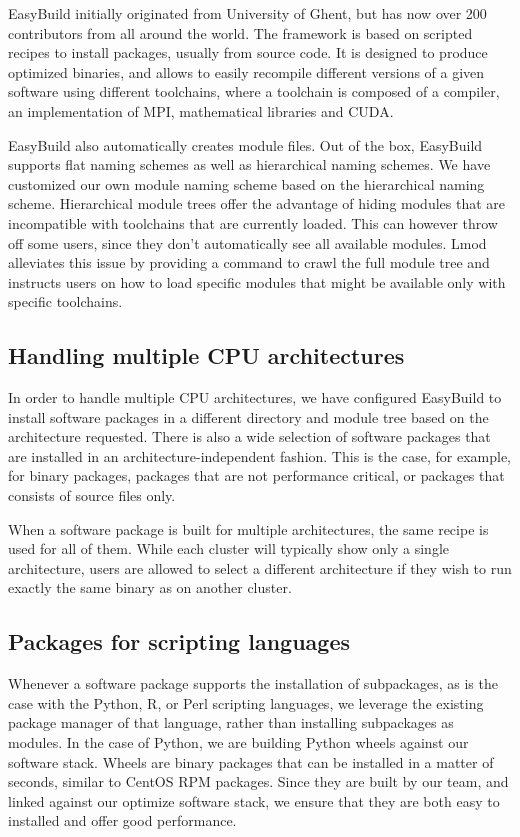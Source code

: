 \documentclass[sigconf]{acmart}
\begin{document}
EasyBuild initially originated from University of Ghent, but has now over 200 contributors from all around the world.
The framework is based on scripted recipes to install packages, usually from source code. It is designed to produce
optimized binaries, and allows to easily recompile different versions of a given software using different toolchains,
where a toolchain is composed of a compiler, an implementation of MPI, mathematical libraries and CUDA.

EasyBuild also automatically creates module files. Out of the box, EasyBuild supports flat naming schemes as well as
hierarchical naming schemes. We have customized our own module naming scheme based on the hierarchical naming scheme.
Hierarchical module trees offer the advantage of hiding modules that are incompatible with toolchains that are
currently loaded. This can however throw off some users, since they don’t automatically see all available modules. Lmod
\cite{Lmod} alleviates this issue by providing a command to crawl the full module tree and instructs users on how to
load specific modules that might be available only with specific toolchains.


\subsection{Handling multiple CPU architectures}
\label{sub:Handling_multiple_CPU_architectures}
In order to handle multiple CPU architectures, we have configured EasyBuild to install software packages in a different
directory and module tree based on the architecture requested. There is also a wide selection of software packages that
are installed in an architecture-independent fashion. This is the case, for example, for binary packages, packages that
are not performance critical, or packages that consists of source files only.

When a software package is built for multiple architectures, the same recipe is used for all of them. While each
cluster will typically show only a single architecture, users are allowed to select a different architecture if they
wish to run exactly the same binary as on another cluster.

\subsection{Packages for scripting languages}
\label{sub:Packages_for_scripting_languages}
Whenever a software package supports the installation of subpackages, as is the case with the Python, R, or Perl
scripting languages, we leverage the existing package manager of that language, rather than installing subpackages as
modules. In the case of Python, we are building Python wheels \cite{Wheels} against our software stack. Wheels are
binary packages that can be installed in a matter of seconds, similar to CentOS RPM packages. Since they are built by
our team, and linked against our optimize software stack, we ensure that they are both easy to installed and offer good
performance.
\end{document}
